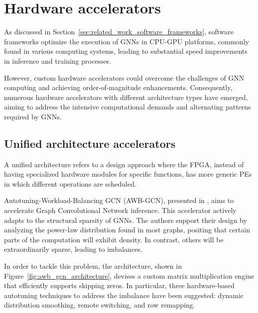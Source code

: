 \section{Hardware accelerators}
\label{sec:hardware_accelerators}%

As discussed in Section~\ref{sec:related_work_software_frameworks}, software frameworks optimize the execution of GNNs in CPU-GPU platforms, commonly found in various computing systems, leading to substantial speed improvements in inference and training processes.

However, custom hardware accelerators could overcome the challenges of GNN computing and achieving order-of-magnitude enhancements.
Consequently, numerous hardware accelerators with different architecture types have emerged, aiming to address the intensive computational demands and alternating patterns required by GNNs.

\subsection{Unified architecture accelerators}\label{subsec:unified-architecture-accelerators}%

A unified architecture refers to a design approach where the FPGA, instead of having specialized hardware modules for specific functions, has more generic PEs in which different operations are scheduled.

Autotuning-Workload-Balancing GCN (AWB-GCN), presented in \cite{DBLP:journals/corr/abs-1908-10834}, aims to accelerate Graph Convolutional Network inference.
This accelerator actively adapts to the structural sparsity of GNNs. The authors support their design by analyzing the power-law distribution found in most graphs, positing that certain parts of the computation will exhibit density. In contrast, others will be extraordinarily sparse, leading to imbalances.

In order to tackle this problem, the architecture, shown in Figure~\ref{fig:awb_gcn_architecture}, devises a custom matrix multiplication engine that efficiently supports skipping zeros.
In particular, three hardware-based autotuning techniques to address the imbalance have been suggested: dynamic distribution smoothing, remote switching, and row remapping.


